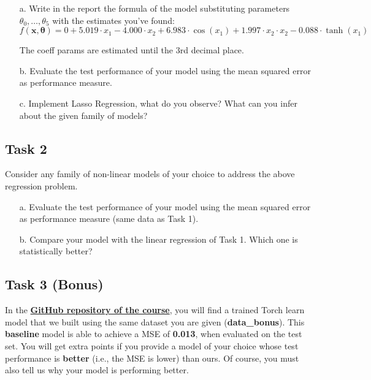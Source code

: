 \documentclass[unicode, 11pt, a4paper]{scrartcl}
\begin{document}
\begin{itemize}
	\item [a.] Write in the report the formula of the model substituting parameters
	      $\theta_0, \ldots, \theta_5$
	      with the estimates you've found:
	      $$f(\mathbf{x}, \boldsymbol{\theta})
		      =  0
		      + 5.019 \cdot x_1
		      - 4.000 \cdot x_2
		      + 6.983 \cdot \cos(x_1)
		      + 1.997 \cdot x_2 \cdot x_2
		      - 0.088 \cdot \tanh(x_1)$$

	      The coeff params are estimated until the 3rd decimal place.

	\item [b.] Evaluate the test performance of your model using the mean squared error as performance measure.

	\item [c.] Implement Lasso Regression, what do you observe?
	      What can you infer about the given family of models?
\end{itemize}


\subsection*{Task 2}
Consider any family of non-linear models of your choice to address the above regression problem.
\begin{itemize}
	\item [a.] Evaluate the test performance of your model using the mean squared error as performance measure (same data as Task 1).
	\item [b.] Compare your model with the linear regression of Task 1. Which one is {statistically} better?
\end{itemize}

\subsection*{Task 3 (Bonus)}
In the \href{https://github.com/FatimaEzzedinee/ML-bachelor-course-assignments-sp24}{\textbf{GitHub repository of the course}}, you will find a trained Torch learn model that we built using the same dataset you are given (\textbf{data\_bonus}).
This \textbf{baseline} model is able to achieve a MSE of \textbf{0.013}, when evaluated on the test set.
You will get extra points if you provide a model of your choice whose test performance is \textbf{better} (i.e., the MSE is lower) than ours. Of course, you must also tell us why your model is performing better.

\end{document}
